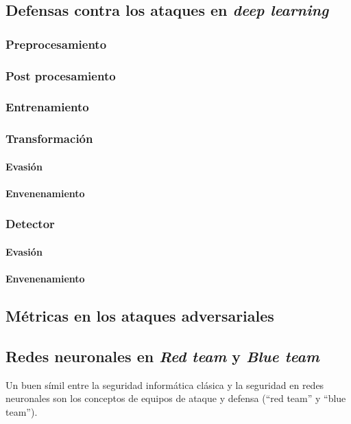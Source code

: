 
\subsection{Defensas contra los ataques en \textit{deep learning}}
\subsubsection{Preprocesamiento}
\subsubsection{Post procesamiento}
\subsubsection{Entrenamiento}
\subsubsection{Transformación}
\paragraph{Evasión}
\paragraph{Envenenamiento}
\subsubsection{Detector}
\paragraph{Evasión}
\paragraph{Envenenamiento}

\subsection{Métricas en los ataques adversariales}

\subsection{Redes neuronales en \textit{Red team} y \textit{Blue team}}
Un buen símil entre la seguridad informática clásica y la seguridad en redes neuronales son los conceptos de equipos de ataque y defensa (``red team'' y ``blue team'').

